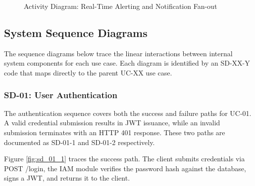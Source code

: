 \begin{figure}[H]
{
    }
    \caption{Activity Diagram: Real-Time Alerting and Notification Fan-out}
    \label{fig:activity_alerting}
\end{figure}

\subsection{System Sequence Diagrams}
The sequence diagrams below trace the linear interactions between internal system components for each use case. Each diagram is identified by an SD-XX-Y code that maps directly to the parent UC-XX use case.

\subsubsection{SD-01: User Authentication}
The authentication sequence covers both the success and failure paths for UC-01. A valid credential submission results in JWT issuance, while an invalid submission terminates with an HTTP 401 response. These two paths are documented as SD-01-1 and SD-01-2 respectively.

Figure \ref{fig:sd_01_1} traces the success path. The client submits credentials via POST /login, the IAM module verifies the password hash against the database, signs a JWT, and returns it to the client.

